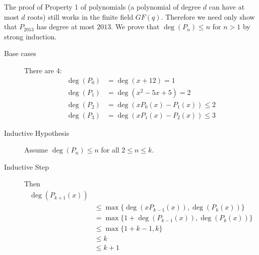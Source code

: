 \begin{enumerate}[label=(\alph*)]
\begin{solution}[2.5 in]
The proof of Property 1 of polynomials (a polynomial of degree $d$ can 
have at most $d$ roots) still works in the finite field $GF(q)$. 
Therefore we need only show that $P_{2013}$ has degree at most $2013$. 
We prove that $\operatorname{deg}(P_n) \leq n$ for $n>1$ by strong induction.
\begin{description}
\item[Base cases] There are 4:
\begin{equation}
\begin{split}
\operatorname{deg}(P_0) &= \operatorname{deg}(x+12) = 1 \\ \nonumber
\operatorname{deg}(P_1) &= \operatorname{deg}(x^2 - 5x + 5) = 2 \\
\operatorname{deg}(P_2) &= \operatorname{deg}(xP_0(x) - P_1(x)) \leq 2 \\
\operatorname{deg}(P_3) &= \operatorname{deg}(xP_1(x) - P_2(x)) \leq 3
\end{split}
\end{equation}
\item[Inductive Hypothesis] Assume $\operatorname{deg}(P_n) \leq n$ 
for all $2\leq n \leq k$.
\item[Inductive Step] Then
\begin{equation}
\begin{split}
\operatorname{deg} (P_{k+1}(x)) \\ \nonumber
&\leq \operatorname{max} \{  \operatorname{deg}(xP_{k-1}(x)), 
\operatorname{deg}(P_k(x)) \}  \\
&= \operatorname{max} \{ 1 + \operatorname{deg}(P_{k-1}(x)), 
\operatorname{deg}(P_k(x)) \} \\
&\leq \operatorname{max} \{1+k - 1, k \} \\
& \leq k \\
& \leq k+1
\end{split}
\end{equation}
\end{description}
\end{solution}
\end{enumerate}
